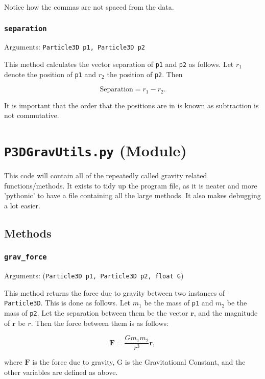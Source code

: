\documentclass[a4paper, 11pt, british, left=1in, right=1in, top=0.3in, bottom=1in]{article}
\begin{document}
	Notice how the commas are not spaced from the data.
	
	\subsubsection{\texttt{separation}}
	
	Arguments: \texttt{Particle3D p1, Particle3D p2}
	
	This method calculates the vector separation of \texttt{p1} and \texttt{p2} as follows. Let $r_1$ denote the position of \texttt{p1} and $r_2$ the position of \texttt{p2}. Then
	
	$$\text{Separation} = r_1 - r_2.$$
	
	It is important that the order that the positions are in is known as subtraction is not commutative. 
	
	\pagebreak
	
	\section{\texttt{P3DGravUtils.py} (Module)}
	
	This code will contain all of the repeatedly called gravity related functions/methods. It exists to tidy up the program file, as it is neater and more 'pythonic' to have a file containing all the large methods. It also makes debugging a lot easier. 
	
	\subsection{Methods}
	
	\subsubsection{\texttt{grav\_force}}
	
	Arguments: (\texttt{Particle3D p1, Particle3D p2, float G})
	
	This method returns the force due to gravity between two instances of \texttt{Particle3D}. This is done as follows. Let $m_1$ be the mass of \texttt{p1} and $m_2$ be the mass of \texttt{p2}. Let the separation between them be the vector $\textbf{r}$, and the magnitude of $\textbf{r}$ be $r$. Then the force between them is as follows:
	
	$$\textbf{F} = \frac{Gm_1m_2}{r^3}\textbf{r},$$
	
	where $\textbf{F}$ is the force due to gravity, G is the Gravitational Constant, and the other variables are defined as above. 
	
\end{document}
